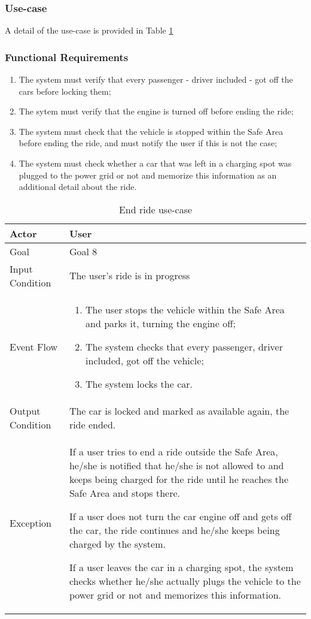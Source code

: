 \subsubsection{Use-case}
A detail of the use-case is provided in Table \ref{end_ride_uc}

\subsubsection{Functional Requirements}
\begin{enumerate}
\item The system must verify that every passenger - driver included - got off the cars before locking them;
\item The sytem must verify that the engine is turned off before ending the ride;
\item The system must check that the vehicle is stopped within the Safe Area before ending the ride, and must notify the user if this is not the case;
\item The system must check whether a car that was left in a charging spot was plugged to the power grid or not and memorize this information as an additional detail about the ride.
\end{enumerate}

\begin{table}[H]
\begin{center}
\begin{tabular}{p{} | p{}}
\hline
Actor & User\\
\hline
Goal & Goal 8\\
\hline
Input Condition & The user's ride is in progress\\
\hline
Event Flow & 
\begin{enumerate}
\item The user stops the vehicle within the Safe Area and parks it, turning the engine off;
\item The system checks that every passenger, driver included, got off the vehicle;
\item The system locks the car.
\end{enumerate} \\
\hline
Output Condition & The car is locked and marked as available again, the ride ended.\\
\hline
Exception & If a user tries to end a ride outside the Safe Area, he/she is notified that he/she is not allowed to and keeps being charged for the ride until he reaches the Safe Area and stops there.

If a user does not turn the car engine off and gets off the car, the ride continues and he/she keeps being charged by the system.

If a user leaves the car in a charging spot, the system checks whether he/she actually plugs the vehicle to the power grid or not and memorizes this information.\\
\hline
\end{tabular}
\end{center}
\caption{End ride use-case}
\label{end_ride_uc}
\end{table}
